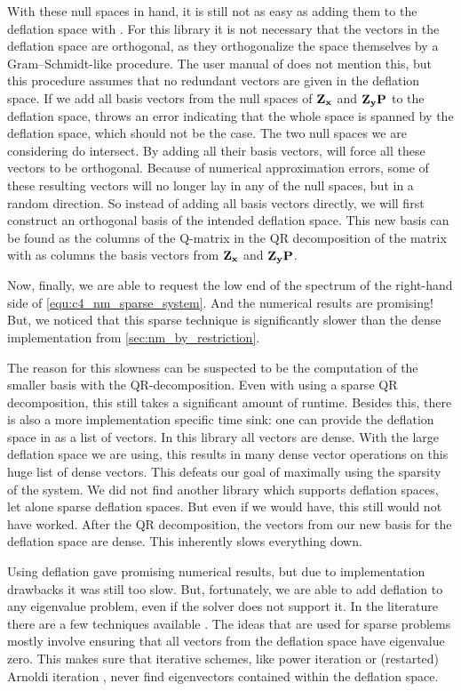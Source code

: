 With these null spaces in hand, it is still not as easy as adding them to the deflation space with \slepc{}. For this library it is not necessary that the vectors in the deflation space are orthogonal, as they orthogonalize the space themselves by a Gram--Schmidt-like procedure. The user manual of \slepc{} does not mention this, but this procedure assumes that no redundant vectors are given in the deflation space. If we add all basis vectors from the null spaces of $\vb{Z_x}$ and $\vb{Z_y}\vb{P}$ to the deflation space, \slepc{} throws an error indicating that the whole space is spanned by the deflation space, which should not be the case. The two null spaces we are considering do intersect. By adding all their basis vectors, \slepc{} will force all these vectors to be orthogonal. Because of numerical approximation errors, some of these resulting vectors will no longer lay in any of the null spaces, but in a random direction. So instead of adding all basis vectors directly, we will first construct an orthogonal basis of the intended deflation space. This new basis can be found as the columns of the Q-matrix in the QR decomposition of the matrix with as columns the basis vectors from $\vb{Z_x}$ and $\vb{Z_y} \vb{P}$.

Now, finally, we are able to request the low end of the spectrum of the right-hand side of \eqref{equ:c4_nm_sparse_system}. And the numerical results are promising! But, we noticed that this sparse technique is significantly slower than the dense implementation from \ref{sec:nm_by_restriction}.

The reason for this slowness can be suspected to be the computation of the smaller basis with the QR-decomposition. Even with using a sparse QR decomposition, this still takes a significant amount of runtime. Besides this, there is also a more implementation specific time sink: one can provide the deflation space in \slepc{} as a list of vectors. In this library all vectors are dense. With the large deflation space we are using, this results in many dense vector operations on this huge list of dense vectors. This defeats our goal of maximally using the sparsity of the system. We did not find another library which supports deflation spaces, let alone sparse deflation spaces. But even if we would have, this still would not have worked. After the QR decomposition, the vectors from our new basis for the deflation space are dense. This inherently slows everything down.

Using deflation gave promising numerical results, but due to implementation drawbacks it was still too slow. But, fortunately, we are able to add deflation to any eigenvalue problem, even if the solver does not support it. In the literature there are a few techniques available \cite[section 4.2]{saad_numerical_2011}\cite{mackey_deflation_2008}. The ideas that are used for sparse problems mostly involve ensuring that all vectors from the deflation space have eigenvalue zero. This makes sure that iterative schemes, like power iteration or (restarted) Arnoldi iteration \cite{arnoldi_principle_1951}\cite[Chapter 6]{trefethen_numerical_1997}, never find eigenvectors contained within the deflation space.

